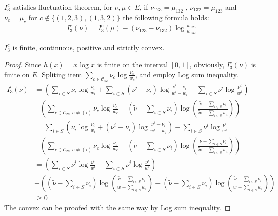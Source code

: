\documentclass[11pt,en,cite=authoryear]{elegantpaper}
\begin{document}
\begin{corollary}
    $I_3^c$ satisfies fluctuation theorem, for $\nu, \mu \in E$, if $\nu_{123} = \mu_{132}$ , $\nu_{132} = \mu_{123}$ and $\nu_c = \mu_c$ for $c \notin \{(1,2,3), (1,3,2)\}$ the following formula holds:
    \begin{align*}
        I_3^c(\nu) = I_3^c(\mu) - (\nu_{123} - \nu_{132}) \log \frac{w_{123}}{w_{132}}
    \end{align*}
\end{corollary}

\begin{corollary}
    $I_3^c$ is  finite, continuous, positive and strictly convex.
\end{corollary}
\begin{proof}
    Since $h(x) = x \log x$ is finite on the interval $[0, 1]$, obviously, $I^c_3(\nu)$ is finite on $E$.
    Spliting item $\sum_{c \in \mathcal{C}_{\infty}} \nu_{c} \log \frac{\nu_{c}}{w_c}$, and employ Log sum inequality.
    \begin{align*}
        I^c_3(\nu) 
        &= \left(\sum_{i\in S} \nu_{i}\log \frac{\nu_{i}}{w_i} + \sum_{i\in S}(\nu^i - \nu_i)\log \frac{\nu^i - \nu_i}{w^i - w_i} 
        - \sum_{i\in S} \nu^i \log \frac{\nu^i}{w^i} \right)\\
        &+ \left(\sum_{c \in \mathcal{C}_{\infty}, c\neq (i)} \nu_{c} \log \frac{\nu_{c}}{w_c} 
        -(\tilde{\nu} - \sum_{i\in S}\nu_i)\log(\frac{\tilde{\nu} - \sum_{i\in S}\nu_i}{\tilde{w} - \sum_{i\in S}w_i}) \right)\\
        &= \sum_{i\in S} \left(\nu_{i}\log \frac{\nu_{i}}{w_i} 
        + (\nu^i - \nu_i)\log \frac{\nu^i - \nu_i}{w^i - w_i} \right)
        - \sum_{i\in S} \nu^i \log \frac{\nu^i}{w^i} \\
        &+ \left(\sum_{c \in \mathcal{C}_{\infty}, c\neq (i)} \nu_{c} \log \frac{\nu_{c}}{w_c} 
        -(\tilde{\nu} - \sum_{i\in S}\nu_i)\log(\frac{\tilde{\nu} - \sum_{i\in S}\nu_i}{\tilde{w} - \sum_{i\in S}w_i}) \right)\\ 
        &= \left(\sum_{i\in S} \nu^i \log \frac{\nu^i}{w^i} 
        - \sum_{i\in S} \nu^i \log \frac{\nu^i}{w^i} \right)\\
        &+ \left( (\tilde{\nu} - \sum_{i\in S}\nu_i)\log(\frac{\tilde{\nu} - \sum_{i\in S}\nu_i}{\tilde{w} - \sum_{i\in S}w_i}) 
        -(\tilde{\nu} - \sum_{i\in S}\nu_i)\log(\frac{\tilde{\nu} - \sum_{i\in S}\nu_i}{\tilde{w} - \sum_{i\in S}w_i}) \right)\\
        &\ge 0
    \end{align*}
    The convex can be proofed with the same way by Log sum inequality.
\end{proof}
\end{document}
